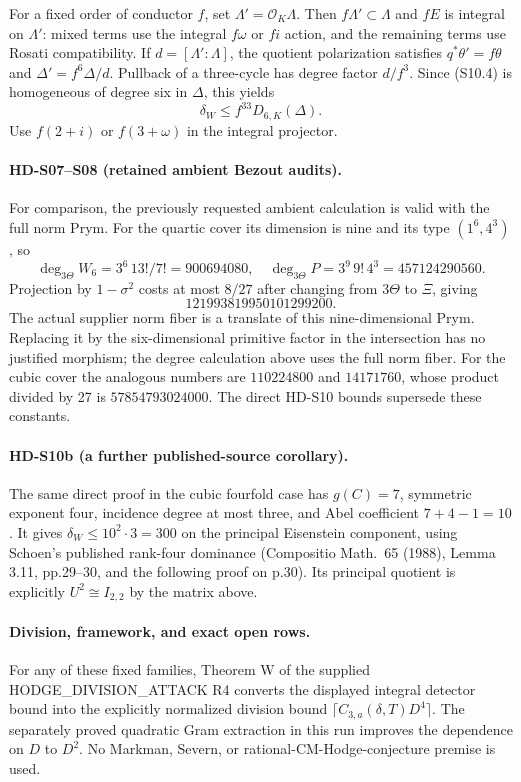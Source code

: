 For a fixed order of conductor \(f\), set
\(\Lambda'=\mathcal O_K\Lambda\). Then \(f\Lambda'\subset\Lambda\)
and \(fE\) is integral on \(\Lambda'\): mixed terms use the integral
\(f\omega\) or \(fi\) action, and the remaining terms use Rosati
compatibility. If \(d=[\Lambda':\Lambda]\), the quotient polarization
satisfies \(q^*\theta'=f\theta\) and
\(\Delta'=f^6\Delta/d\).
Pullback of a three-cycle has degree factor \(d/f^3\).
Since (S10.4) is homogeneous of degree six in \(\Delta\), this yields
\[
\delta_W\le f^{33}D_{6,K}(\Delta).
\]
Use \(f(2+i)\) or \(f(3+\omega)\) in the integral projector.

\paragraph{HD-S07--S08 (retained ambient Bezout audits).}
For comparison, the previously requested ambient calculation is valid
with the full norm Prym.
For the quartic cover its dimension is nine and its type
\((1^6,4^3)\), so
\[
\deg_{3\Theta}W_6=3^6\,13!/7!=900694080,\quad
\deg_{3\Theta}P=3^9\,9!\,4^3=457124290560.
\]
Projection by \(1-\sigma^2\) costs at most \(8/27\) after changing
from \(3\Theta\) to \(\Xi\), giving
\[121993819950101299200.\]
The actual supplier norm fiber is a translate of this nine-dimensional
Prym. Replacing it by the six-dimensional primitive factor in the
intersection has no justified morphism; the degree calculation above
uses the full norm fiber.
For the cubic cover the analogous numbers are
\(110224800\) and \(14171760\), whose product divided by 27 is
\(57854793024000\).
The direct HD-S10 bounds supersede these constants.

\paragraph{HD-S10b (a further published-source corollary).}
The same direct proof in the cubic fourfold case has \(g(C)=7\),
symmetric exponent four, incidence degree at most three, and Abel
coefficient \(7+4-1=10\). It gives
\(\delta_W\le10^2\cdot3=300\) on the principal Eisenstein component,
using Schoen's published rank-four dominance
(Compositio Math.\ 65 (1988), Lemma 3.11, pp.29--30,
and the following proof on p.30).
Its principal quotient is explicitly \(U^2\cong I_{2,2}\) by the
matrix above.

\paragraph{Division, framework, and exact open rows.}
For any of these fixed families, Theorem W of the supplied
HODGE\_DIVISION\_ATTACK R4 converts the displayed integral detector
bound into the explicitly normalized division bound
\(\lceil C_{3,a}(\delta,T)D^4\rceil\).
The separately proved quadratic Gram extraction in this run improves
the dependence on \(D\) to \(D^2\).
No Markman, Severn, or rational-CM-Hodge-conjecture premise is used.

